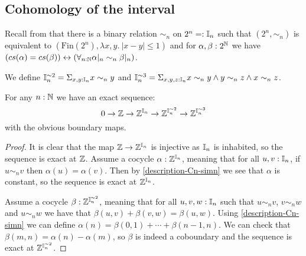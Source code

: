 \subsection{Cohomology of the interval}
%
%
\begin{remark}\label{description-Cn-simn}
  Recall from  that 
  there is a binary relation $\sim_n$ on $2^n=:\mathbb{I}_n$ such that 
  $(2^n,\sim_n)$ is equivalent to  $(\mathrm{Fin}(2^n),\lambda x,y.\ |x-y|\leq 1)$
  and for $\alpha,\beta:2^{\mathbb{N}}$ we have $(cs(\alpha) = cs(\beta)) \leftrightarrow 
  \left(\forall_{n:\mathbb{N}}\alpha|_n \sim_n \beta|_n\right)$. 
\end{remark}

We define $\mathbb{I}_n^{\sim2} = \Sigma_{x,y:\mathbb{I}_n}x\sim_n y$ and $\mathbb{I}_n^{\sim3} = \Sigma_{x,y,z:\mathbb{I}_n}x\sim_n y \land y\sim_n z\land x\sim_n z$.

\begin{lemma}\label{Cn-exact-sequence}
For any $n:\mathbb{N}$ we have an exact sequence:
\[0\to \mathbb{Z}\to \mathbb{Z}^{\mathbb{I}_n} \to \mathbb{Z}^{\mathbb{I}_n^{\sim2}} \to \mathbb{Z}^{\mathbb{I}_n^{\sim3}}\]
with the obvious boundary maps.
\end{lemma}

\begin{proof}
It is clear that the map $\mathbb{Z}\to \mathbb{Z}^{\mathbb{I}_n}$ is injective as $\mathbb{I}_n$ is inhabited, so the sequence is exact at $\mathbb{Z}$. Assume a cocycle $\alpha:\mathbb{Z}^{\mathbb{I}_n}$, meaning that for all $u,v:\mathbb{I}_n$, if $u\sim_nv$ then $\alpha(u)=\alpha(v)$. Then by \cref{description-Cn-simn} we see that $\alpha$ is constant, so the sequence is exact at $\mathbb{Z}^{\mathbb{I}_n}$.

Assume a cocycle $\beta:\mathbb{Z}^{\mathbb{I}_n^{\sim2}}$, meaning that for all $u,v,w:\mathbb{I}_n$ such that $u\sim_nv$, $v\sim_nw$ and $u\sim_nw$ we have that $\beta(u,v)+\beta(v,w) = \beta(u,w)$. %
Using \cref{description-Cn-simn} we can define $\alpha(n) = \beta(0,1)+\cdots+\beta(n-1,n)$.
We can check that $\beta(m,n) = \alpha(n)-\alpha(m)$, so $\beta$ is indeed a coboundary and the sequence is exact at $\mathbb{Z}^{\mathbb{I}_n^{\sim2}}$.
\end{proof}

